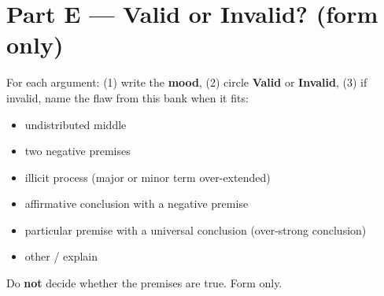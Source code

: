 \documentclass[11pt]{article}
\begin{document}
\newpage
\section*{Part E --- Valid or Invalid? (form only)}
\noindent For each argument: (1) write the \textbf{mood}, (2) circle \textbf{Valid} or \textbf{Invalid}, (3) if invalid, name the flaw from this bank when it fits:

\begin{itemize}
\item undistributed middle
\item two negative premises
\item illicit process (major or minor term over-extended)
\item affirmative conclusion with a negative premise
\item particular premise with a universal conclusion (over-strong conclusion)
\item other / explain
\end{itemize}
\noindent Do \textbf{not} decide whether the premises are true. Form only.
\end{document}
